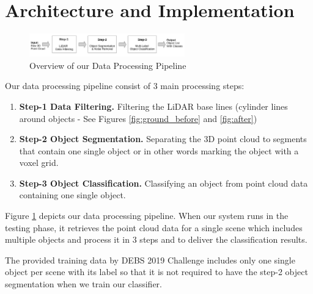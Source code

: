 \section{Architecture and Implementation}\label{sec:Architecture}

\begin{figure}[!ht]
 \begin{center}
   \includegraphics[width=0.6\textwidth]{./images/DataProcessingPipleline.pdf}
   \caption{Overview of our Data Processing Pipeline}
   \label{fig:dataPipeline}
 \end{center}
\end{figure}

Our data processing pipeline consist of 3 main processing steps:

\begin{enumerate}
  \item \textbf{Step-1 Data Filtering. } Filtering the LiDAR base lines (cylinder lines around objects - See Figures \ref{fig:ground_before} and \ref{fig:after})

  \item \textbf{Step-2 Object Segmentation.} Separating the 3D point cloud to segments that contain one single object or in other words marking the object with a voxel grid.

  \item \textbf{Step-3 Object Classification.}  Classifying an object from point cloud data containing one single object.
\end{enumerate}




Figure \ref{fig:dataPipeline} depicts our data processing pipeline. 
When our system runs in the testing phase, it retrieves the point cloud data for a single scene which includes multiple objects and process 
it in 3 steps and to deliver the classification results.

The provided training data by DEBS 2019 Challenge \cite{DEBSGC2019} includes only one single object per scene 
with its label so that it is not required to have the step-2 object segmentation when we train our classifier.


